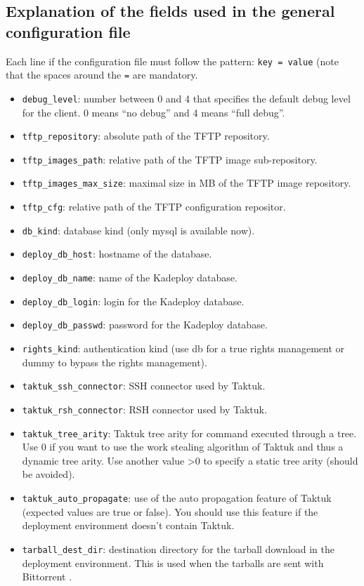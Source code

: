 \documentclass[a4wide,10pt,oneside]{book}
\begin{document}
\subsection{Explanation of the fields used in the general configuration file}
Each line if the configuration file must follow the pattern: \texttt{key = value} (note that the spaces around the \texttt{=} are mandatory.
\begin{itemize}
\item \texttt{debug\_level}: number between 0 and 4 that specifies the default debug level for the client. 0 means ``no debug'' and 4 means ``full debug''.
\item \texttt{tftp\_repository}: absolute path of the TFTP repository.
\item \texttt{tftp\_images\_path}: relative path of the TFTP image sub-repository.
\item \texttt{tftp\_images\_max\_size}: maximal size in MB of the TFTP image repository.
\item \texttt{tftp\_cfg}: relative path of the TFTP configuration repositor.
\item \texttt{db\_kind}: database kind (only mysql is available now).
\item \texttt{deploy\_db\_host}: hostname of the database.
\item \texttt{deploy\_db\_name}: name of the Kadeploy database.
\item \texttt{deploy\_db\_login}: login for the Kadeploy database.
\item \texttt{deploy\_db\_passwd}: password for the Kadeploy database.
\item \texttt{rights\_kind}: authentication kind (use db for a true rights management or dummy to bypass the rights management).
\item \texttt{taktuk\_ssh\_connector}: SSH connector used by Taktuk.
\item \texttt{taktuk\_rsh\_connector}: RSH connector used by Taktuk.
\item \texttt{taktuk\_tree\_arity}: Taktuk tree arity for command executed through a tree. Use 0 if you want to use the work stealing algorithm of Taktuk and thus a dynamic tree arity. Use another value >0 to specify a static tree arity (should be avoided).
\item \texttt{taktuk\_auto\_propagate}: use of the auto propagation feature of Taktuk (expected values are true or false). You should use this feature if the deployment environment doesn't contain Taktuk.
\item \texttt{tarball\_dest\_dir}: destination directory for the tarball download in the deployment environment. This is used when the tarballs are sent with Bittorrent .

\end{itemize}
\end{document}
